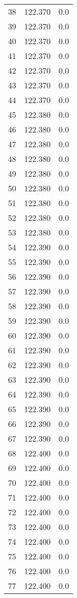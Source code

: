 \begin{tabular}{lrr}
38  &  122.370 &   0.0 \\
39  &  122.370 &   0.0 \\
40  &  122.370 &   0.0 \\
41  &  122.370 &   0.0 \\
42  &  122.370 &   0.0 \\
43  &  122.370 &   0.0 \\
44  &  122.370 &   0.0 \\
45  &  122.380 &   0.0 \\
46  &  122.380 &   0.0 \\
47  &  122.380 &   0.0 \\
48  &  122.380 &   0.0 \\
49  &  122.380 &   0.0 \\
50  &  122.380 &   0.0 \\
51  &  122.380 &   0.0 \\
52  &  122.380 &   0.0 \\
53  &  122.380 &   0.0 \\
54  &  122.390 &   0.0 \\
55  &  122.390 &   0.0 \\
56  &  122.390 &   0.0 \\
57  &  122.390 &   0.0 \\
58  &  122.390 &   0.0 \\
59  &  122.390 &   0.0 \\
60  &  122.390 &   0.0 \\
61  &  122.390 &   0.0 \\
62  &  122.390 &   0.0 \\
63  &  122.390 &   0.0 \\
64  &  122.390 &   0.0 \\
65  &  122.390 &   0.0 \\
66  &  122.390 &   0.0 \\
67  &  122.390 &   0.0 \\
68  &  122.400 &   0.0 \\
69  &  122.400 &   0.0 \\
70  &  122.400 &   0.0 \\
71  &  122.400 &   0.0 \\
72  &  122.400 &   0.0 \\
73  &  122.400 &   0.0 \\
74  &  122.400 &   0.0 \\
75  &  122.400 &   0.0 \\
76  &  122.400 &   0.0 \\
77  &  122.400 &   0.0 \\

\end{tabular}
